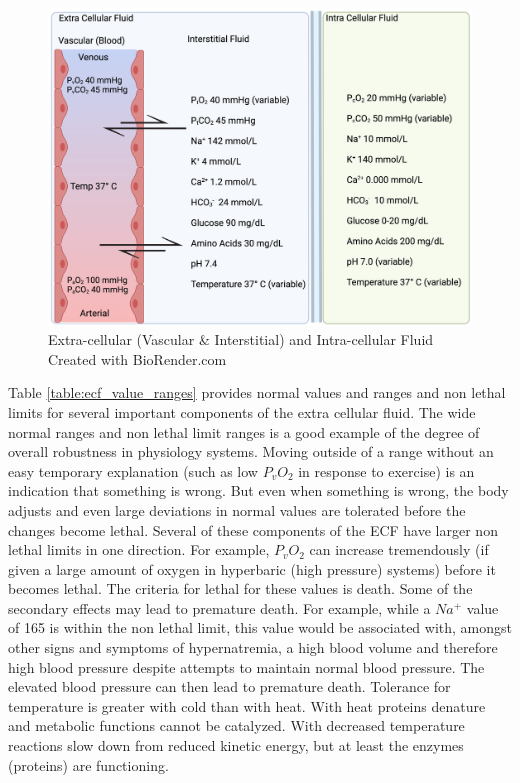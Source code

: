 \begin{figure}[!h]
    \centering
    \includegraphics[width=1\linewidth]{./figure/ecf.png}
    \caption{Extra-cellular (Vascular \& Interstitial) and Intra-cellular Fluid \footnotesize{Created with BioRender.com}}
    \label{fig:ecf}
\end{figure}

Table \ref{table:ecf_value_ranges} provides normal values and ranges and non lethal limits for several important components of the extra cellular fluid.  The wide normal ranges and non lethal limit ranges is a good example of the degree of overall robustness in physiology systems. Moving outside of a range without an easy temporary explanation (such as low $P_v O_2$ in response to exercise) is an indication that something is wrong. But even when something is wrong, the body adjusts and even large deviations in normal values are tolerated before the changes become lethal. Several of these components of the ECF have larger non lethal limits in one direction. For example, $P_v O_2$ can increase tremendously (if given a large amount of oxygen in hyperbaric (high pressure) systems) before it becomes lethal. The criteria for lethal for these values is death. Some of the secondary effects may lead to premature death. For example, while a $Na^+$ value of 165 is within the non lethal limit, this value would be associated with, amongst other signs and symptoms of hypernatremia, a high blood volume and therefore high blood pressure despite attempts to maintain normal blood pressure. The elevated blood pressure can then lead to premature death.  Tolerance for temperature is greater with cold than with heat. With heat proteins denature and metabolic functions cannot be catalyzed. With decreased temperature reactions slow down from reduced kinetic energy, but at least the enzymes (proteins) are functioning. 

